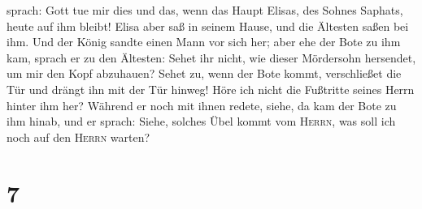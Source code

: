 sprach: Gott tue mir dies und das, wenn das Haupt Elisas, des Sohnes
Saphats, heute auf ihm bleibt!  Elisa aber saß in seinem
Hause, und die Ältesten saßen bei ihm. Und der König sandte einen Mann
vor sich her; aber ehe der Bote zu ihm kam, sprach er zu den Ältesten:
Sehet ihr nicht, wie dieser Mördersohn hersendet, um mir den Kopf
abzuhauen? Sehet zu, wenn der Bote kommt, verschließet die Tür und
drängt ihn mit der Tür hinweg! Höre ich nicht die Fußtritte seines Herrn
hinter ihm her?  Während er noch mit ihnen redete, siehe,
da kam der Bote zu ihm hinab, und er sprach: Siehe, solches Übel kommt
vom \textsc{Herrn}, was soll ich noch auf den \textsc{Herrn} warten?

\hypertarget{section-6}{%
\section{7}\label{section-6}}

